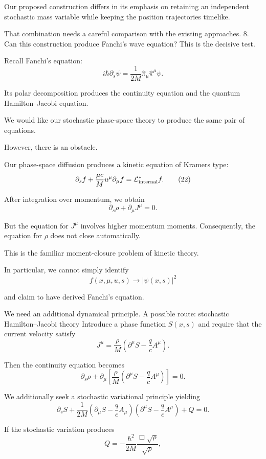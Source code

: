 Our proposed construction differs in its emphasis on retaining an independent stochastic mass variable while keeping the position trajectories timelike.

That combination needs a careful comparison with the existing approaches.
8. Can this construction produce Fanchi's wave equation?
This is the decisive test.

Recall Fanchi's equation:
\[
i\hbar\partial_s\psi
=
\frac{1}{2M}\hat\pi_\mu\hat\pi^\mu\psi.
\tag{21}
\]

Its polar decomposition produces the continuity equation and the quantum Hamilton–Jacobi equation.

We would like our stochastic phase-space theory to produce the same pair of equations.

However, there is an obstacle.

Our phase-space diffusion produces a kinetic equation of Kramers type:
\[
\partial_s f+
\frac{\mu c}{M}u^\mu\partial_\mu f
=
\mathcal L_{\rm internal}^*f.
\tag{22}
\]

After integration over momentum, we obtain
\[
\partial_s\rho+\partial_\mu J^\mu=0.
\]

But the equation for \(J^\mu\) involves higher momentum moments. Consequently, the equation for \(\rho\) does not close automatically.

This is the familiar moment-closure problem of kinetic theory.

In particular, we cannot simply identify
\[
f(x,\mu,u,s)
\longrightarrow |\psi(x,s)|^2
\]

and claim to have derived Fanchi's equation.

We need an additional dynamical principle.
A possible route: stochastic Hamilton–Jacobi theory
Introduce a phase function \(S(x,s)\) and require that the current velocity satisfy
\[
J^\mu
=
\frac{\rho}{M}
\left(
\partial^\mu S-\frac qc A^\mu
\right).
\tag{23}
\]

Then the continuity equation becomes
\[
\partial_s\rho+
\partial_\mu
\left[
\frac{\rho}{M}
\left(\partial^\mu S-\frac qc A^\mu\right)
\right]=0.
\tag{24}
\]

We additionally seek a stochastic variational principle yielding
\[
\partial_s S+
\frac{1}{2M}
\left(\partial_\mu S-\frac qc A_\mu\right)
\left(\partial^\mu S-\frac qc A^\mu\right)
+Q=0.
\tag{25}
\]

If the stochastic variation produces
\[
Q=-\frac{\hbar^2}{2M}
\frac{\Box\sqrt{\rho}}{\sqrt{\rho}},
\tag{26}
\]

